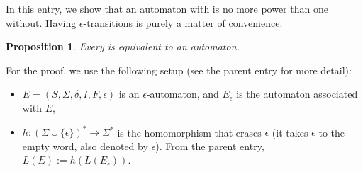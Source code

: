 \documentclass[12pt]{article}
\newtheorem{prop}{Proposition}
\begin{document}
In this entry, we show that an automaton with  is no more power than one without.  Having $\epsilon$-transitions is purely a matter of convenience.

\begin{prop} Every  is equivalent to an automaton. \end{prop}

For the proof, we use the following setup (see the parent entry for more detail):
\begin{itemize}
\item $E=(S,\Sigma,\delta,I,F,\epsilon)$ is an $\epsilon$-automaton, and $E_{\epsilon}$ is the automaton associated with $E$,
\item $h:(\Sigma\cup\lbrace \epsilon\rbrace)^* \to \Sigma^*$ is the homomorphism that erases $\epsilon$ (it takes $\epsilon$ to the empty word, also denoted by $\epsilon$).  From the parent entry, $L(E):=h(L(E_{\epsilon}))$.
\end{itemize}
\end{document}

